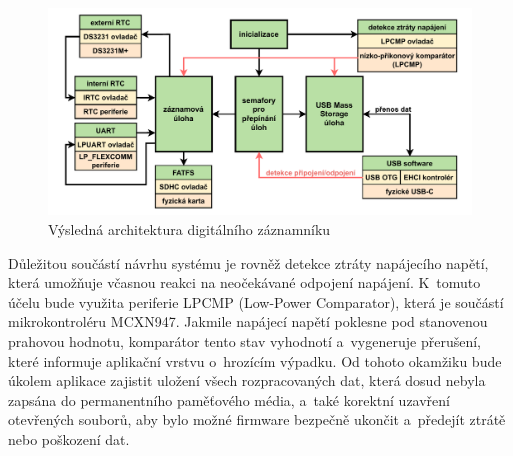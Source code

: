 \begin{figure}[h]
    \centering
    \includegraphics[width=1.00\textwidth]{obrazky-figures/system_architecture.pdf}
    
    \caption{Výsledná architektura digitálního záznamníku}
    \label{fig:system-architecture}
\end{figure}

\newpage

Důležitou součástí návrhu systému je rovněž detekce ztráty napájecího napětí, která umožňuje včasnou reakci na neočekávané odpojení napájení. K~tomuto účelu bude využita periferie LPCMP (Low-Power Comparator), která je součástí mikrokontroléru MCXN947. Jakmile napájecí napětí poklesne pod stanovenou prahovou hodnotu, komparátor tento stav vyhodnotí a~vygeneruje přerušení, které informuje aplikační vrstvu o~hrozícím výpadku. Od tohoto okamžiku bude úkolem aplikace zajistit uložení všech rozpracovaných dat, která dosud nebyla zapsána do permanentního paměťového média, a~také korektní uzavření otevřených souborů, aby bylo možné firmware bezpečně ukončit a~předejít ztrátě nebo poškození dat.






